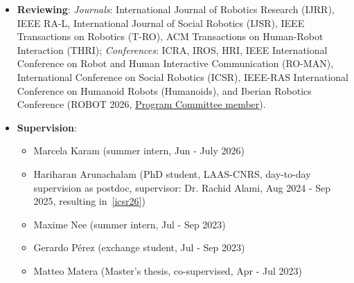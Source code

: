 \documentclass[11pt]{article}
\begin{document}
\begin{itemize}[leftmargin=*,topsep=0pt,itemsep=1pt,parsep=0pt]
\begin{itemize}[label=--,leftmargin=*,topsep=0pt,itemsep=0pt,parsep=0pt]
    \end{itemize}
    \item \textbf{Reviewing}: \textit{Journals}: International Journal of Robotics Research (IJRR), IEEE RA-L, International Journal of Social Robotics (IJSR), IEEE Transactions on Robotics (T-RO), ACM Transactions on Human-Robot Interaction (THRI); \textit{Conferences}: ICRA, IROS, HRI, IEEE International Conference on Robot and Human Interactive Communication (RO-MAN), International Conference on Social Robotics (ICSR), IEEE-RAS International Conference on Humanoid Robots (Humanoids), and Iberian Robotics Conference (ROBOT 2026, \href{https://robot2026.upc.edu/committee/}{Program Committee member}).
    \item \textbf{Supervision}:
    \begin{itemize}[label=--,leftmargin=*,topsep=0pt,itemsep=0pt,parsep=0pt]
        \item Marcela Karam (summer intern, Jun - July 2026)
        \item Hariharan Arunachalam (PhD student, LAAS-CNRS, day-to-day supervision as postdoc, supervisor: Dr. Rachid Alami, Aug 2024 - Sep 2025, resulting in~\ref{icsr26})
        \item Maxime Nee (summer intern, Jul - Sep 2023)
        \item Gerardo Pérez (exchange student, Jul - Sep 2023)
        \item Matteo Matera (Master's thesis, co-supervised, Apr - Jul 2023)
    \end{itemize}
\end{itemize}
\end{document}
